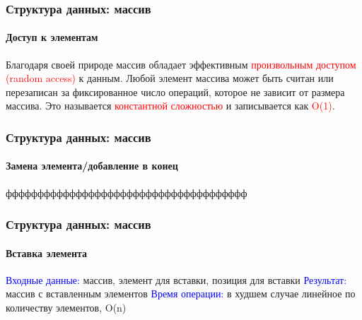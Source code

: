 \documentclass[aspectratio=169]{beamer}
\begin{document}
\begin{frame}
\frametitle{Структура данных: массив}
\framesubtitle{Доступ к элементам}
\justifying
\small
Благодаря своей природе массив обладает эффективным \textcolor{red}{произвольным доступом (random access)} к данным. Любой элемент массива может быть считан или перезаписан за фиксированное число операций, которое не зависит от размера массива. Это называется \textcolor{red}{константной сложностью} и записывается как \textcolor{red}{O(1)}.\newline
\begin{figure}
    \captionsetup[subfigure]{labelformat=empty}
    \centering
\end{figure}
\end{frame}

\begin{frame}
\frametitle{Структура данных: массив}
\framesubtitle{Замена элемента/добавление в конец}
\justifying
\small
фффффффффффффффффффффффффффффффффффффф
\end{frame}

\begin{frame}
\frametitle{Структура данных: массив}
\framesubtitle{Вставка элемента}
\justifying
\small
\textcolor{blue}{Входные данные:} массив, элемент для вставки, позиция для вставки\newline
\textcolor{blue}{Результат:} массив с вставленным элементов\newline
\textcolor{blue}{Время операции:} в худшем случае линейное по количеству элементов, O(n)
\begin{figure}
    \captionsetup[subfigure]{labelformat=empty}
    \centering
\end{figure}
\end{frame}
\end{document}
